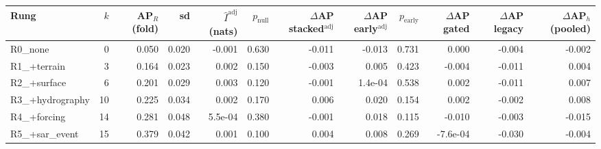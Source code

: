 \begin{tabular}{lrrrrrrrrrrr}
\toprule
Rung & $k$ & AP$_R$ (fold) & sd & $\hat I^{\mathrm{adj}}$ (nats) & $p_{\mathrm{null}}$ & $\Delta$AP stacked$^{\mathrm{adj}}$ & $\Delta$AP early$^{\mathrm{adj}}$ & $p_{\mathrm{early}}$ & $\Delta$AP gated & $\Delta$AP legacy & $\Delta$AP$_h$ (pooled) \\
\midrule
R0\_none & 0 & 0.050 & 0.020 & -0.001 & 0.630 & -0.011 & -0.013 & 0.731 & 0.000 & -0.004 & -0.002 \\
R1\_+terrain & 3 & 0.164 & 0.023 & 0.002 & 0.150 & -0.003 & 0.005 & 0.423 & -0.004 & -0.011 & 0.004 \\
R2\_+surface & 6 & 0.201 & 0.029 & 0.003 & 0.120 & -0.001 & 1.4e-04 & 0.538 & 0.002 & -0.011 & 0.007 \\
R3\_+hydrography & 10 & 0.225 & 0.034 & 0.002 & 0.170 & 0.006 & 0.020 & 0.154 & 0.002 & -0.002 & 0.008 \\
R4\_+forcing & 14 & 0.281 & 0.048 & 5.5e-04 & 0.380 & -0.001 & 0.018 & 0.115 & -0.010 & -0.003 & -0.015 \\
R5\_+sar\_event & 15 & 0.379 & 0.042 & 0.001 & 0.100 & 0.004 & 0.008 & 0.269 & -7.6e-04 & -0.030 & -0.004 \\
\bottomrule
\end{tabular}
